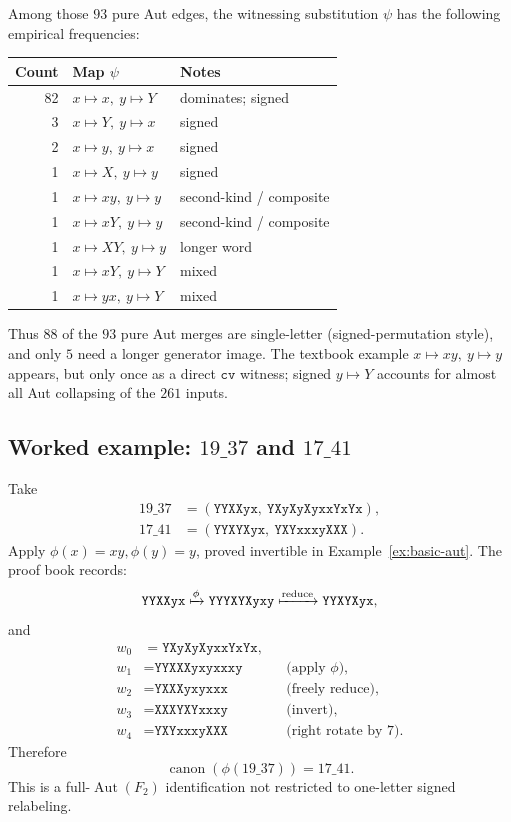 \documentclass[11pt]{article}
\theoremstyle{definition}
\theoremstyle{remark}
\newcommand{\F}{F_2}
\newcommand{\Aut}{\operatorname{Aut}}
\newcommand{\canon}{\operatorname{canon}}
\begin{document}
Among those \(93\) pure Aut edges, the witnessing substitution \(\psi\) has
the following empirical frequencies:

\begin{center}
\begin{tabular}{r l l}
\toprule
Count & Map \(\psi\) & Notes\\
\midrule
82 & \(x\mapsto x,\ y\mapsto Y\) & dominates; signed\\
3 & \(x\mapsto Y,\ y\mapsto x\) & signed\\
2 & \(x\mapsto y,\ y\mapsto x\) & signed\\
1 & \(x\mapsto X,\ y\mapsto y\) & signed\\
1 & \(x\mapsto xy,\ y\mapsto y\) & second-kind / composite\\
1 & \(x\mapsto xY,\ y\mapsto y\) & second-kind / composite\\
1 & \(x\mapsto XY,\ y\mapsto y\) & longer word\\
1 & \(x\mapsto xY,\ y\mapsto Y\) & mixed\\
1 & \(x\mapsto yx,\ y\mapsto Y\) & mixed\\
\bottomrule
\end{tabular}
\end{center}

Thus \(88\) of the \(93\) pure Aut merges are single-letter (signed-permutation
style), and only \(5\) need a longer generator image.  The textbook example
\(x\mapsto xy,\ y\mapsto y\) appears, but only once as a direct \(\texttt{cv}\)
witness; signed \(y\mapsto Y\) accounts for almost all Aut collapsing of the
\(261\) inputs.

\subsection{Worked example: \(19\_37\) and \(17\_41\)}

Take
\begin{align*}
19\_37&=(\texttt{YYXXyx},\ \texttt{YXyXyXyxxYxYx}),\\
17\_41&=(\texttt{YYXYXyx},\ \texttt{YXYxxxyXXX}).
\end{align*}
Apply \(\phi(x)=xy,\phi(y)=y\), proved invertible in
Example~\ref{ex:basic-aut}.  The proof book records:
\[
\texttt{YYXXyx}
\xmapsto{\phi}
\texttt{YYYXYXyxy}
\xmapsto{\text{reduce}}
\texttt{YYXYXyx},
\]
and
\[
\begin{aligned}
w_0&=\texttt{YXyXyXyxxYxYx},\\
w_1&=\texttt{YYXXXyxyxxxy}
  &&\text{(apply \(\phi\))},\\
w_2&=\texttt{YXXXyxyxxx}
  &&\text{(freely reduce)},\\
w_3&=\texttt{XXXYXYxxxy}
  &&\text{(invert)},\\
w_4&=\texttt{YXYxxxyXXX}
  &&\text{(right rotate by \(7\))}.
\end{aligned}
\]
Therefore
\[
  \canon(\phi(19\_37))=17\_41.
\]
This is a full-\(\Aut(\F)\) identification not restricted to one-letter
signed relabeling.
\end{document}
